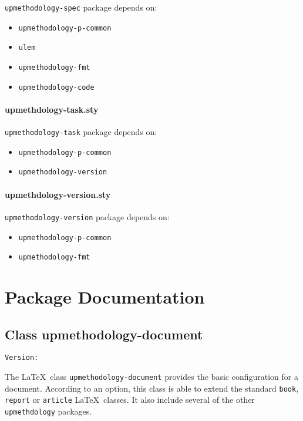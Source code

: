 \documentclass[book]{upmethodology-document}
\makeatletter
\let\VERdocclazz\upm@package@docclazz@ver
\makeatother
\begin{document}
\texttt{upmethodology-spec} package depends on:
\begin{itemize}
\item \texttt{upmethodology-p-common}
\item \texttt{ulem}
\item \texttt{upmethodology-fmt}
\item \texttt{upmethodology-code}
\end{itemize}

\subsection{upmethdology-task.sty}

\texttt{upmethodology-task} package depends on:
\begin{itemize}
\item \texttt{upmethodology-p-common}
\item \texttt{upmethodology-version}
\end{itemize}

\subsection{upmethdology-version.sty}

\texttt{upmethodology-version} package depends on:
\begin{itemize}
\item \texttt{upmethodology-p-common}
\item \texttt{upmethodology-fmt}
\end{itemize}

\part{Package Documentation}

\chapter{Class upmethodology-document}

\begin{center}
	\texttt{Version: \VERdocclazz}
\end{center}

The \LaTeX\ class \texttt{upmethodology-document} provides the basic configuration for a document. According to an option, this class is able to extend the standard \texttt{book}, \texttt{report} or \texttt{article} \LaTeX\ classes. It also include several of the other \texttt{upmethdology} packages.
\end{document}
